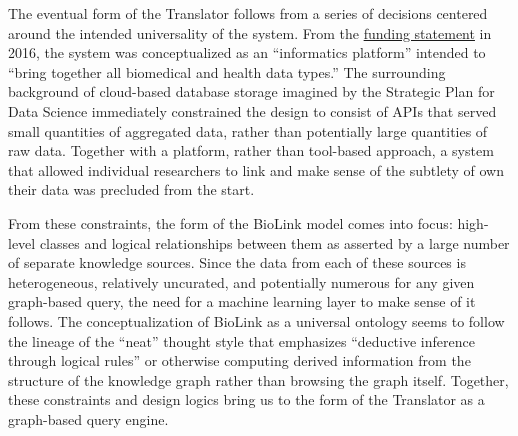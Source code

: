 The eventual form of the Translator follows from a series of decisions
centered around the intended universality of the system. From the
\href{https://web.archive.org/web/20210709100523/https://ncats.nih.gov/news/releases/2016/feasibility-assessment-translator}{funding
statement} in 2016, the system was conceptualized as an ``informatics
platform'' intended to ``bring together all biomedical and health data
types.'' The surrounding background of cloud-based database storage
imagined by the Strategic Plan for Data Science immediately constrained
the design to consist of APIs that served small quantities of aggregated
data, rather than potentially large quantities of raw data. Together
with a platform, rather than tool-based approach, a system that allowed
individual researchers to link and make sense of the subtlety of own
their data was precluded from the start.

From these constraints, the form of the BioLink model comes into focus:
high-level classes and logical relationships between them as asserted by
a large number of separate knowledge sources. Since the data from each
of these sources is heterogeneous, relatively uncurated, and potentially
numerous for any given graph-based query, the need for a machine
learning layer to make sense of it follows. The conceptualization of
BioLink as a universal ontology seems to follow the lineage of the
``neat'' thought style \citep{poirierTurnScruffyEthnographic2017} 
that emphasizes ``deductive inference through logical rules'' \citep{unniBiolinkModelUniversal2022}  or otherwise computing derived
information from the structure of the knowledge graph rather than
browsing the graph itself. Together, these constraints and design logics
bring us to the form of the Translator as a graph-based query engine.

